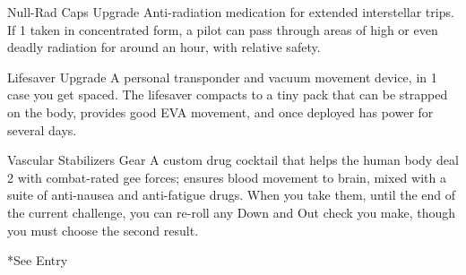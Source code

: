   Null-Rad Caps                 Upgrade     Anti-radiation medication for extended interstellar trips. If           1 
                                            taken in concentrated form, a pilot can pass through areas  
                                             of high or even deadly radiation for around an hour, with  
                                             relative safety. 

  Lifesaver                     Upgrade     A personal transponder and vacuum movement device, in                   1 
                                             case you get spaced. The lifesaver compacts to a tiny  
                                             pack that can be strapped on the body, provides good  
                                             EVA movement, and once deployed has power for several  
                                             days. 

  Vascular Stabilizers          Gear        A custom drug cocktail that helps the human body deal                   2 
                                            with combat-rated gee forces; ensures blood movement to  
                                             brain, mixed with a suite of anti-nausea and anti-fatigue  
                                             drugs. When you take them, until the end of the current  
                                             challenge, you can re-roll any Down and Out check you  
                                             make, though you must choose the second result. 

                                                                                                                          


*See Entry
 
